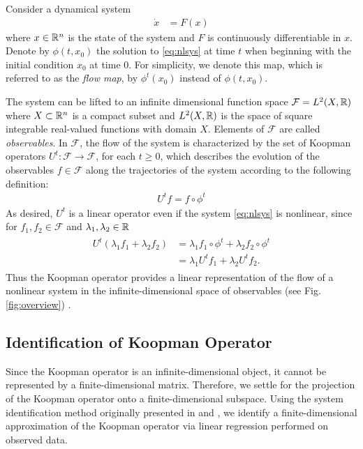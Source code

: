 Consider a dynamical system
\begin{align}
    \dot{x} &= F (x)    \label{eq:nlsys}
\end{align}
where $x \in \mathbb{R}^n$ is the state of the system and ${F}$ is continuously differentiable in $x$.
Denote by $\phi(t,x_0)$ the solution to \eqref{eq:nlsys} at time $t$ when beginning with the initial condition $x_0$ at time $0$.
For simplicity, we denote this map, which is referred to as the \emph{flow map}, by $\phi^t (x_0)$ instead of $\phi (t, x_0)$.

The system can be lifted to an infinite dimensional function space $\mathcal{F} = L^2(X, \mathbb{R})$ where $X \subset \mathbb{R}^n$ is a compact subset and $L^2(X , \mathbb{R})$ is the space of square integrable real-valued functions with domain $X$.
Elements of $\mathcal{F}$ are called \emph{observables}.
In $\mathcal{F}$, the flow of the system is characterized by the set %
of Koopman operators 
$U^t : \mathcal{F} \to \mathcal{F}$, for each $t \geq 0$,
which describes the evolution of the observables ${f \in \mathcal{F}}$ along the trajectories of the system according to the following definition:
\begin{align}
    U^t f = f \circ \phi^t      
    \label{eq:koopman}
\end{align}
As desired, $U^t$ is a linear operator even if the system \eqref{eq:nlsys} is nonlinear, since for $f_1, f_2 \in \mathcal{F}$ and $\lambda_1, \lambda_2 \in \mathbb{R}$
\begin{align}
    \begin{split}
    U^t (\lambda_1 f_1 + \lambda_2 f_2) &= \lambda_1 f_1 \circ \phi^t + \lambda_2 f_2 \circ \phi^t \\
    &= \lambda_1 U^t f_1 + \lambda_2 U^t f_2.
    \end{split}
\end{align}
Thus the Koopman operator provides a linear representation of the flow of a nonlinear system in the infinite-dimensional space of observables (see Fig. \ref{fig:overview}) \cite{budivsic2012applied}.


\subsection{Identification of Koopman Operator}

Since the Koopman operator is an infinite-dimensional object, it cannot be represented by a finite-dimensional matrix. 
Therefore, we settle for the projection of the Koopman operator onto a finite-dimensional subspace.
Using the system identification method originally presented in \cite{mauroy2016linear} and \cite{mauroy2017koopman}, we identify a finite-dimensional approximation of the Koopman operator via linear regression performed on observed data.

